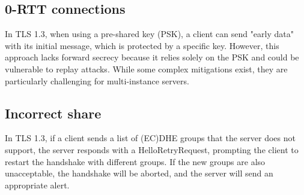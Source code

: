 \documentclass{report}
\begin{document}
\subsection{0-RTT connections}
In TLS 1.3, when using a pre-shared key (PSK), a client can send
"early data" with its initial message, which is protected by a
specific key. However, this approach lacks forward secrecy because it
relies solely on the PSK and could be vulnerable to replay attacks.
While some complex mitigations exist, they are particularly
challenging for multi-instance servers.

\subsection{Incorrect share}
In TLS 1.3, if a client sends a list of (EC)DHE groups that the server
does not support, the server responds with a HelloRetryRequest,
prompting the client to restart the handshake with different groups.
If the new groups are also unacceptable, the handshake will be
aborted, and the server will send an appropriate alert.
\end{document}
